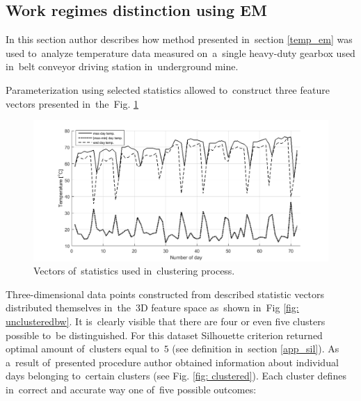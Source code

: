 
\subsection{Work regimes distinction using EM}\label{result_em}

In this section author describes how method presented in~section \ref{temp_em} was used to~analyze temperature data measured on~a~single heavy-duty gearbox used in~belt conveyor driving station in~underground mine.

Parameterization using selected statistics allowed to~construct three feature vectors presented in~the~Fig. \ref{fig: cluster_stats_day}

\begin{figure}[ht!]
\centering
\includegraphics[width = \textwidth]{wykresy/cluster_stats_day.png}
\caption{Vectors of~statistics used in~clustering process.}
\label{fig: cluster_stats_day}
\end{figure}

Three-dimensional data points constructed from described statistic vectors distributed themselves in~the~3D feature space as~shown in~Fig \ref{fig: unclusteredbw}. It is~clearly visible that there are four or even five clusters possible to~be distinguished. For this dataset Silhouette criterion returned optimal amount of~clusters equal to~$5$ (see definition in~section \ref{app_sil}). As a~result of~presented procedure author obtained information about individual days belonging to~certain clusters (see Fig. \ref{fig: clustered}). Each cluster defines in~correct and accurate way one of~five possible outcomes:

